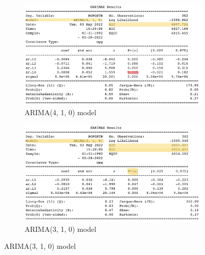 \documentclass[12pt]{article}
\begin{document}
\begin{figure}[H]
	\centering
	\begin{subfigure}{1.0\textwidth}
		\includegraphics[width=\textwidth]{images/arima410.png}
		\caption{ARIMA(4, 1, 0) model}
	\end{subfigure}

    \bigskip

	\begin{subfigure}{1.0\textwidth}
		\includegraphics[width=\textwidth]{images/arima310.png}
		\caption{ARIMA(3, 1, 0) model}
	\end{subfigure}
\end{figure}

\pagebreak

\begin{center}
        \textbf{\Large{}}
\end{center}
\end{document}
